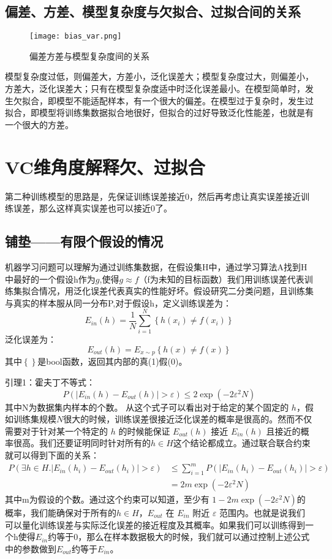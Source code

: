 \documentclass[forprint]{report}
\begin{document}
\subsection{偏差、方差、模型复杂度与欠拟合、过拟合间的关系}
\begin{figure}[ht]
	\centering
	\texttt{[image: bias\_var.png]}
	\caption{偏差方差与模型复杂度间的关系}
	\label{fig:1}
\end{figure}
模型复杂度过低，则偏差大，方差小，泛化误差大；模型复杂度过大，则偏差小，方差大，泛化误差大；只有在模型复杂度适中时泛化误差最小。在模型简单时，发生欠拟合，即模型不能适配样本，有一个很大的偏差。在模型过于复杂时，发生过拟合，即模型将训练集数据拟合地很好，但拟合的过好导致泛化性能差，也就是有一个很大的方差。
\section{VC维角度解释欠、过拟合}
第二种训练模型的思路是，先保证训练误差接近0，然后再考虑让真实误差接近训练误差，那么这样真实误差也可以接近0了。
\subsection{铺垫——有限个假设的情况}
机器学习问题可以理解为通过训练集数据，在假设集H中，通过学习算法A找到H中最好的一个假设h作为$g$,使得$g\approx f$（f为未知的目标函数）我们用训练误差代表训练集拟合情况，用泛化误差代表真实的性能好坏。假设研究二分类问题，且训练集与真实的样本服从同一分布P,对于假设h，定义训练误差为：$$
E_{in}\left( h \right) =\frac{1}{N}\sum_{i=1}^N{\left\{ h\left( x_i \right) \ne f\left( x_i \right) \right\}}
$$泛化误差为：
$$
E_{out}\left( h \right) =E_{x \sim p}\left\{ h\left( x \right) \ne f\left( x \right) \right\} 
$$
其中$\left\{  \right\} $是bool函数，返回其内部的真(1)假(0)。

\noindent
引理1：霍夫丁不等式：
$$
P\left( \left| E_{in}\left( h \right) -E_{out}\left( h \right) \right|>\varepsilon \right) \leqslant 2\exp \left( -2\varepsilon ^2N \right) 
$$其中N为数据集内样本的个数。
从这个式子可以看出对于给定的某个固定的 $h$，假如训练集规模$N$很大的时候，训练误差很接近泛化误差的概率是很高的。然而不仅需要对于针对某一个特定的 $h$ 的时候能保证 $E_{out}\left( h \right)$ 接近 $E_{in}\left( h \right)$ 且接近的概率很高。我们还要证明同时针对所有的$h\in H$这个结论都成立。通过联合联合约束就可以得到下面的关系：
$$
\begin{aligned}
P\left( \exists h\in H.\left| E_{in}\left( h_i \right) -E_{out}\left( h_i \right) \right|>\varepsilon \right)&\leqslant \sum_{i=1}^m{P\left( \left| E_{in}\left( h_i \right) -E_{out}\left( h_i \right) \right|>\varepsilon \right)}
\\
&=2m\exp \left( -2\varepsilon ^2N \right) 
\end{aligned}
$$
其中m为假设的个数。通过这个约束可以知道，至少有 $
1-2m\exp \left( -2\varepsilon ^2N \right) 
$的概率，我们能确保对于所有的$h\in H$，$E_{out}$ 在 $E_{in}$ 附近 $\varepsilon $ 范围内。也就是说我们可以量化训练误差与实际泛化误差的接近程度及其概率。如果我们可以训练得到一个h使得$E_{in}$约等于0，那么在样本数据极大的时候，我们就可以通过控制上述公式中的参数做到$E_{out}$约等于$E_{in}$。
\end{document}
